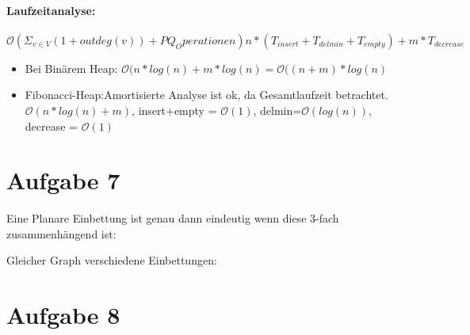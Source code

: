 \documentclass[10pt,a4paper]{article}
\begin{document}
\paragraph{Laufzeitanalyse:}
	$\mathcal{O}(\Sigma_{v\in V}(1+outdeg(v))+PQ_Operationen)n*(T_{insert}+T_{delmin}+T_{empty})+m*T_{decrease}$
	\begin{itemize}
		\item Bei Binärem Heap: $\mathcal{O}(n*log(n)+m*log(n)=\mathcal{O}((n+m)*log(n)$
		\item Fibonacci-Heap:Amortisierte Analyse ist ok, da Gesamtlaufzeit betrachtet. $\mathcal{O}(n*log(n)+m)$, insert+empty = $\mathcal{O}(1)$, delmin=$\mathcal{O}(log(n))$, decrease = $\mathcal{O}(1)$
	\end{itemize}

\section*{Aufgabe 7}

Eine Planare Einbettung ist genau dann eindeutig wenn diese 3-fach zusammenhängend ist:

\begin{center}
	\resizebox{.2\columnwidth}{!}{
		
	}
\end{center}

Gleicher Graph verschiedene Einbettungen:

\begin{center}
	\resizebox{.5\columnwidth}{!}{
		
	}
\end{center}


\section*{Aufgabe 8}
\end{document}
